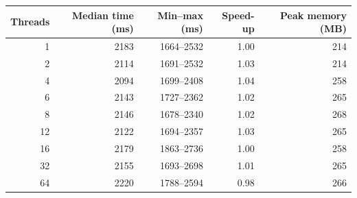 \begin{tabular}{rrrrr}
\toprule
Threads & Median time (ms) & Min--max (ms) & Speed-up & Peak memory (MB) \\
\midrule
1 & 2183 & 1664--2532 & 1.00 & 214 \\
2 & 2114 & 1691--2532 & 1.03 & 214 \\
4 & 2094 & 1699--2408 & 1.04 & 258 \\
6 & 2143 & 1727--2362 & 1.02 & 265 \\
8 & 2146 & 1678--2340 & 1.02 & 268 \\
12 & 2122 & 1694--2357 & 1.03 & 265 \\
16 & 2179 & 1863--2736 & 1.00 & 258 \\
32 & 2155 & 1693--2698 & 1.01 & 265 \\
64 & 2220 & 1788--2594 & 0.98 & 266 \\
\bottomrule
\end{tabular}
